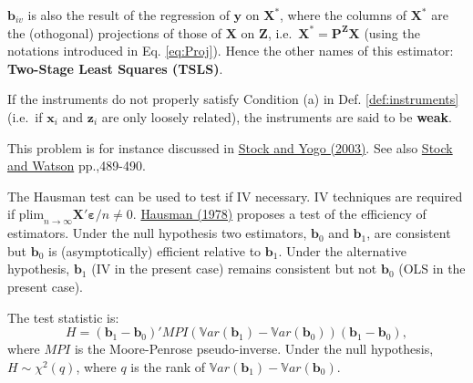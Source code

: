 \documentclass[
]{book}
\theoremstyle{definition}
\theoremstyle{definition}
\theoremstyle{definition}
\theoremstyle{definition}
\theoremstyle{remark}
\begin{document}
\(\mathbf{b}_{iv}\) is also the result of the regression of \(\mathbf{y}\) on \(\mathbf{X^*}\), where the columns of \(\mathbf{X}^*\) are the (othogonal) projections of those of \(\mathbf{X}\) on \(\mathbf{Z}\), i.e.~\(\mathbf{X^*} = \mathbf{P^{Z}X}\) (using the notations introduced in Eq. \eqref{eq:Proj}). Hence the other names of this estimator: \textbf{Two-Stage Least Squares (TSLS)}.

If the instruments do not properly satisfy Condition (a) in Def. \ref{def:instruments} (i.e.~if \(\mathbf{x}_i\) and \(\mathbf{z}_i\) are only loosely related), the instruments are said to be \textbf{weak}.

This problem is for instance discussed in \href{http://scholar.harvard.edu/files/stock/files/testing_for_weak_instruments_in_linear_iv_regression.pdf}{Stock and Yogo (2003)}. See also \href{https://www.pearson.com/us/higher-education/product/Stock-Introduction-to-Econometrics-3rd-Edition/9780138009007.html}{Stock and Watson} pp.,489-490.

The Hausman test can be used to test if IV necessary. IV techniques are required if \(\mbox{plim}_{n \rightarrow \infty} \mathbf{X}'\boldsymbol\varepsilon / n \ne 0\). \href{http://www.jstor.org/stable/1913827?seq=1\#page_scan_tab_contents}{Hausman (1978)} proposes a test of the efficiency of estimators. Under the null hypothesis two estimators, \(\mathbf{b}_0\) and \(\mathbf{b}_1\), are consistent but \(\mathbf{b}_0\) is (asymptotically) efficient relative to \(\mathbf{b}_1\). Under the alternative hypothesis, \(\mathbf{b}_1\) (IV in the present case) remains consistent but not \(\mathbf{b}_0\) (OLS in the present case).

The test statistic is:
\[
H = (\mathbf{b}_1 - \mathbf{b}_0)' MPI(\mathbb{V}ar(\mathbf{b}_1) - \mathbb{V}ar(\mathbf{b}_0))(\mathbf{b}_1 - \mathbf{b}_0),
\]
where \(MPI\) is the Moore-Penrose pseudo-inverse. Under the null hypothesis, \(H \sim \chi^2(q)\), where \(q\) is the rank of \(\mathbb{V}ar(\mathbf{b}_1) - \mathbb{V}ar(\mathbf{b}_0)\).
\end{document}
